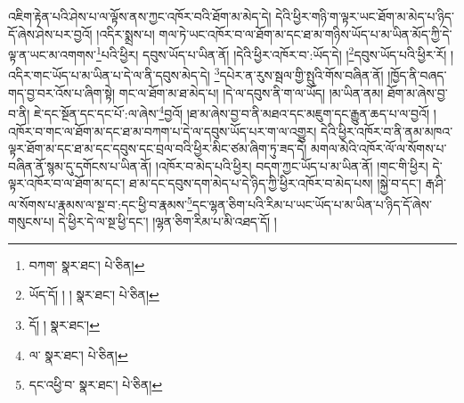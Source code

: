 འཇིག་རྟེན་པའི་ཤེས་པ་ལ་ལྟོས་ནས་ཀྱང་འཁོར་བའི་ཐོག་མ་མེད་དེ། དེའི་ཕྱིར་གཉི་ག་ལྟར་ཡང་ཐོག་མ་མེད་པ་ཉིད་དོ་ཞེས་ཤེས་པར་བྱའོ། །འདིར་སྨྲས་པ། གལ་ཏེ་ཡང་འཁོར་བ་ལ་ཐོག་མ་དང་ཐ་མ་གཉིས་ཡོད་པ་མ་ཡིན་མོད་ཀྱི་དེ་ལྟ་ན་ཡང་མ་འགགས་\footnote{བཀག་  སྣར་ཐང་།  པེ་ཅིན། }པའི་ཕྱིར། དབུས་ཡོད་པ་ཡིན་ནོ། །དེའི་ཕྱིར་འཁོར་བ་:ཡོད་དེ། །\footnote{ཡོད་དོ། ། །  སྣར་ཐང་།  པེ་ཅིན། }དབུས་ཡོད་པའི་ཕྱིར་རོ། །འདིར་གང་ཡོད་པ་མ་ཡིན་པ་དེ་ལ་ནི་དབུས་མེད་དེ། \footnote{དོ། །   སྣར་ཐང་། }དཔེར་ན་རུས་སྦལ་གྱི་སྤུའི་གོས་བཞིན་ནོ། །ཁྱོད་ནི་བཞད་གད་བྱ་བར་འོས་པ་ཞིག་སྟེ། གང་ལ་ཐོག་མ་ཐ་མེད་པ། །དེ་ལ་དབུས་ནི་ག་ལ་ཡོད། །མ་ཡིན་ནམ། ཐོག་མ་ཞེས་བྱ་བ་ནི། ཇེ་དང་སྔོན་དང་དང་པོ་:ལ་ཞེས་\footnote{ལ་  སྣར་ཐང་།  པེ་ཅིན། }བྱའོ། །ཐ་མ་ཞེས་བྱ་བ་ནི་མཐའ་དང་མཇུག་དང་རྒྱུན་ཆད་པ་ལ་བྱའོ། །འཁོར་བ་གང་ལ་ཐོག་མ་དང་ཐ་མ་བཀག་པ་དེ་ལ་དབུས་ཡོད་པར་ག་ལ་འགྱུར། དེའི་ཕྱིར་འཁོར་བ་ནི་ནམ་མཁའ་ལྟར་ཐོག་མ་དང་ཐ་མ་དང་དབུས་དང་བྲལ་བའི་ཕྱིར་མིང་ཙམ་ཞིག་ཏུ་ཟད་དེ། མགལ་མེའི་འཁོར་ལོ་ལ་སོགས་པ་བཞིན་ནོ་སྙམ་དུ་དགོངས་པ་ཡིན་ནོ། །འཁོར་བ་མེད་པའི་ཕྱིར། བདག་ཀྱང་ཡོད་པ་མ་ཡིན་ནོ། །གང་གི་ཕྱིར། དེ་ལྟར་འཁོར་བ་ལ་ཐོག་མ་དང་། ཐ་མ་དང་དབུས་དག་མེད་པ་དེ་ཉིད་ཀྱི་ཕྱིར་འཁོར་བ་མེད་པས། །སྐྱེ་བ་དང་། རྒ་ཤི་ལ་སོགས་པ་རྣམས་ལ་སྔ་བ་:དང་ཕྱི་བ་རྣམས་\footnote{དང་འཕྱི་བ་  སྣར་ཐང་།  པེ་ཅིན། }དང་ལྷན་ཅིག་པའི་རིམ་པ་ཡང་ཡོད་པ་མ་ཡིན་པ་ཉིད་དོ་ཞེས་གསུངས་པ། དེ་ཕྱིར་དེ་ལ་སྔ་ཕྱི་དང་། །ལྷན་ཅིག་རིམ་པ་མི་འཐད་དོ། །
